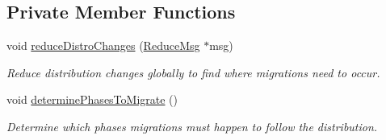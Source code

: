 \subsection*{Private Member Functions}
\begin{DoxyCompactItemize}
\item 
void \hyperlink{structvt_1_1vrt_1_1collection_1_1balance_1_1_l_b_data_restart_reader_a8e8e7c6ddc116665061679c876257a3d}{reduce\+Distro\+Changes} (\hyperlink{structvt_1_1vrt_1_1collection_1_1balance_1_1_l_b_data_restart_reader_a59e2b9e568683c89c9af430adacba420}{Reduce\+Msg} $\ast$msg)
\begin{DoxyCompactList}\small\item\em Reduce distribution changes globally to find where migrations need to occur. \end{DoxyCompactList}\item 
void \hyperlink{structvt_1_1vrt_1_1collection_1_1balance_1_1_l_b_data_restart_reader_af9cb0f3ba080b54902909a34f6fe0fef}{determine\+Phases\+To\+Migrate} ()
\begin{DoxyCompactList}\small\item\em Determine which phases migrations must happen to follow the distribution. \end{DoxyCompactList}\end{DoxyCompactItemize}
